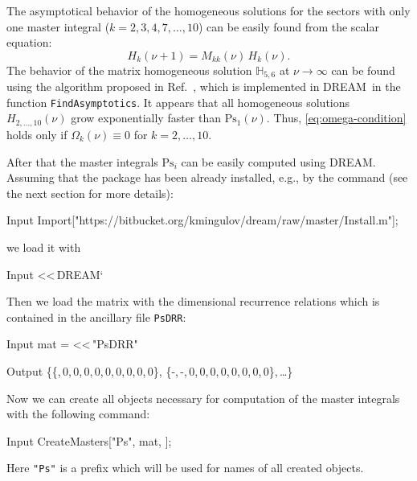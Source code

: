\documentclass[sort&compress]{elsarticle}
\begin{document}
The asymptotical behavior of the homogeneous solutions for the sectors with only one master integral ($k=2,3,4,7,\ldots,10$) can be easily found from the scalar equation:
\begin{equation}
	H_k(\nu+1) = M_{kk}(\nu) \, H_k(\nu).
\end{equation}
The behavior of the matrix homogeneous solution $\mathbb{H}_{5,6}$ at $\nu\to\infty$ can be found using the algorithm proposed in Ref.~\cite{Tulyakov:2011},
which is implemented in DREAM\ in the function \texttt{FindAsymptotics}.
It appears that all homogeneous solutions $H_{2,\ldots,10}(\nu)$ grow exponentially faster than $\mathrm{Ps}_1(\nu)$.
Thus, \cref{eq:omega-condition} holds only if $\Omega_k(\nu) \equiv 0$ for $k=2,\ldots,10$.

After that the master integrals $\mathrm{Ps}_i$ can be easily computed using DREAM.
Assuming that the package has been already installed, e.g., by the command (see the next section for more details):
\begin{mmaCell}{Input}
	Import["https://bitbucket.org/kmingulov/dream/raw/master/Install.m"];
\end{mmaCell}
we load it with
\begin{mmaCell}[moredefined={DREAM}]{Input}
	<<\,DREAM`
\end{mmaCell}
Then we load the matrix with the dimensional recurrence relations which is contained in the ancillary file \texttt{PsDRR}:
\begin{mmaCell}{Input}
	mat = <<\,"PsDRR"
\end{mmaCell}
\begin{mmaCell}{Output}
	\{\{,\,0,\,0,\,0,\,0,\,0,\,0,\,0,\,0,\,0\},
	 \{-,\,-,\,0,\,0,\,0,\,0,\,0,\,0,\,0,\,0\},\,\ldots\}
\end{mmaCell}
Now we can create all objects necessary for computation of the master integrals with the following command:
\begin{mmaCell}[moredefined={CreateMasters,mat}]{Input}
	CreateMasters["Ps", mat, \mmaUnd{\(\nu\)}];
\end{mmaCell}
Here \texttt{"Ps"} is a prefix which will be used for names of all created objects.
\end{document}
